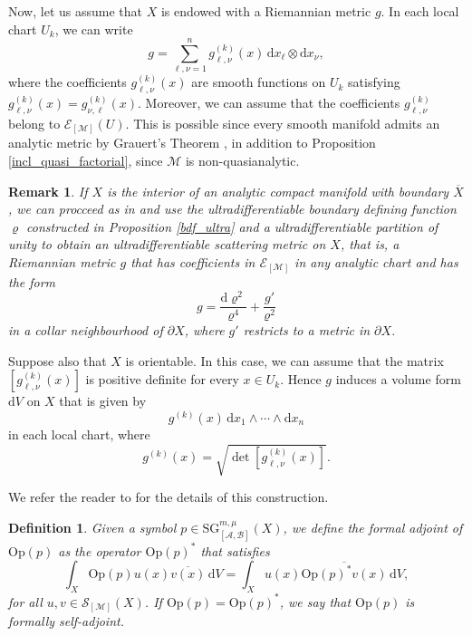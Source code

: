 \documentclass[11pt,reqno]{amsart}
\numberwithin{equation}{section}
\newtheorem{definition}[theorem]{Definition}
\newtheorem{remark}[theorem]{Remark}
\newcommand{\E}{{\mathcal{E}}}
\newcommand{\SG}{{\mathrm{SG}}}
\newcommand{\M}{{\mathcal{M}}} %
\newcommand{\A}{{\mathcal{A}}} %
\newcommand{\B}{{\mathcal{B}}} %
\newcommand{\X}{{\overline{X}}}
\begin{document}
Now, let us assume that $X$ is endowed with a Riemannian metric $g$. In each local chart $U_k$, we can write
\begin{equation*}
	g = \sum_{\ell,\nu=1}^n g_{\ell,\nu}^{(k)}(x)\,\mathrm{d}x_\ell\otimes\mathrm{d}x_\nu,
\end{equation*}
%
where the coefficients $g_{\ell,\nu}^{(k)}(x)$ are smooth functions on $U_k$ satisfying $g_{\ell,\nu}^{(k)}(x)=g_{\nu,\ell}^{(k)}(x)$. Moreover, we can assume that the coefficients $g_{\ell,\nu}^{(k)}$ belong to $\E_{[\M]}(U)$. This is possible since every smooth manifold admits an analytic metric by Grauert's Theorem \cite{Grauert}, in addition to Proposition \ref{incl_quasi_factorial}, since $\M$ is non-quasianalytic.

\begin{remark}
	If $X$ is the interior of an analytic compact manifold with boundary $\X$, we can procceed as in \cite{CKMT_GH_Gevrey} and use the ultradifferentiable boundary defining function $\varrho$ constructed in Proposition \ref{bdf_ultra} and a ultradifferentiable partition of unity to obtain an ultradifferentiable scattering metric on $X$, that is, a Riemannian metric $g$ that has coefficients in $\E_{[\M]}$ in any analytic chart and has the form
	\[g = \dfrac{\mathrm{d}\varrho^2}{\varrho^4}+\dfrac{g'}{\varrho^2}\]
	in a collar neighbourhood of $\partial X$, where $g'$ restricts to a metric in $\partial X$.
\end{remark}

Suppose also that $X$ is orientable. In this case, we can assume that the matrix $\left[g_{\ell,\nu}^{(k)}(x)\right]$ is positive definite for every $x\in U_k$. Hence $g$ induces a volume form $\mathrm{d}V$ on $X$ that is given by
%
\[g^{(k)}(x)\,\mathrm{d}x_1\wedge\cdots\wedge \mathrm{d}x_n\]
%
in each local chart, where
%
\[g^{(k)}(x) = \sqrt{\det \left[g_{\ell,\nu}^{(k)}(x)\right]}.\]


We refer the reader to \cite[Proposition 7.7]{Kumano-go} for the details of this construction.


\begin{definition}
	Given a symbol $p\in {\SG}_{[\A,\B]}^{m,\mu}(X)$, we define the formal adjoint of $\mathrm{Op}(p)$ as the operator $\mathrm{Op}(p)^*$ that satisfies
	\begin{equation*}
		\int_X \mathrm{Op}(p)u(x) \overline{v(x)}\,\mathrm{d}V = \int_X u(x) \overline{\mathrm{Op}(p)^* v(x)}\,\mathrm{d}V,
	\end{equation*}
	for all $u,v\in\mathcal{S}_{[\M]}(X)$. If $\mathrm{Op}(p)=\mathrm{Op}(p)^*$, we say that $\mathrm{Op}(p)$ is formally self-adjoint.
\end{definition}
\end{document}
